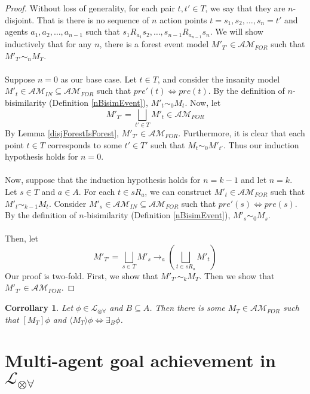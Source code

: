 \documentclass[12pt, a4paper, titlepage]{article}
\newtheorem{corr}{Corrollary}[subsection]
\numberwithin{equation}{section}
\newcommand{\sqex}[1]{[{#1}]}
\newcommand{\anex}[1]{\langle {#1} \rangle}
\newcommand{\lang}{\mathcal{L}}
\newcommand{\langArbAct}{\lang_{\otimes\forall}}
\newcommand{\eventClass}{\mathcal{AM}}
\newcommand{\insaneClass}{\eventClass_{IN}}
\newcommand{\forestClass}{\eventClass_{FOR}}
\begin{document}
\begin{proof}
Without loss of generality, for each pair $t, t' \in T$, we say that they are
$n$-disjoint.
That is there is no sequence of $n$ action points $t = s_1, s_2, \ldots,
s_n = t'$ and agents $a_1, a_2, \ldots, a_{n-1}$ such that $s_1 R_{a_1} s_2,
    \ldots, s_{n-1} R_{a_{n-1}} s_n$.
We will show inductively that for any $n$, there is a forest event model
$M'_{T'} \in \forestClass$ such that $M'_{T'} \sim_n M_T$.\\
\\
Suppose $n = 0$ as our base case.
Let $t \in T$, and consider the insanity model $M'_{t} \in \insaneClass
\subseteq \forestClass$ such that $pre'(t) \iff pre(t)$.
By the definition of $n$-bisimilarity (Definition \ref{nBisimEvent}), $M'_{t}
\sim_0 M_t$.
Now, let
\[
  M'_{T'} = \bigsqcup_{t' \in T} M'_{t} \in \forestClass
\]
By Lemma \ref{disjForestIsForest}, $M'_{T'} \in \forestClass$.
Furthermore, it is clear that each point $t \in T$ corresponds to some $t'
\in T'$ such that $M_t \sim_0 M'_{t'}$.
Thus our induction hypothesis holds for $n = 0$.\\
\\
Now, suppose that the induction hypothesis holds for $n = k-1$ and let $n = k$.
Let $s \in T$ and $a \in A$.
For each $t \in s R_a$, we can construct $M'_t \in \forestClass$ such that
$M'_t \sim_{k-1} M_t$.
Consider $M'_s \in \insaneClass \subseteq \forestClass$ such that $pre'(s) \iff
pre(s)$.
By the definition of $n$-bisimilarity (Definition \ref{nBisimEvent}), $M'_{s}
\sim_0 M_s$.\\
\\
Then, let
\[
  M'_{T'} = \bigsqcup_{s \in T} M'_s \to_a (\bigsqcup_{t \in s R_a} M'_{t})
\]
Our proof is two-fold.
First, we show that $M'_{T'} \sim_k M_T$.
Then we show that $M'_{T'} \in \forestClass$.
\end{proof}

\begin{corr} \label{approximatingBRestricted}
Let $\phi \in \langArbAct$ and $B \subseteq A$.
Then there is some $M_T \in \forestClass$ such that $\sqex{M_T} \phi$ and
$\anex{M_T} \phi \iff \exists_B \phi$.
\end{corr}

\section{Multi-agent goal achievement in $\langArbAct$}
\end{document}
